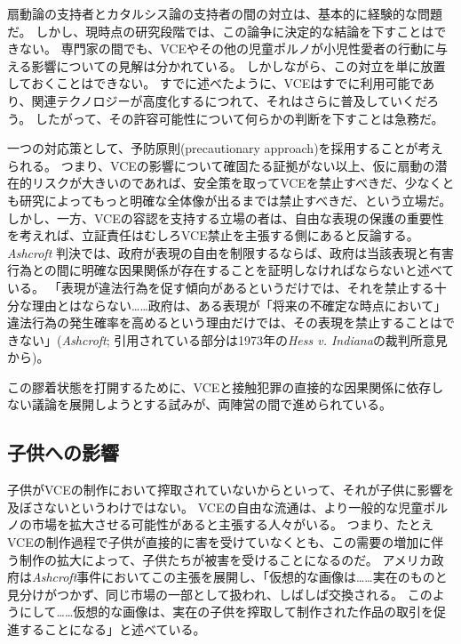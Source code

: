 \documentclass[paper=a4,book,openany]{jlreq} \usepackage{mystyle}
\begin{document}
扇動論の支持者とカタルシス論の支持者の間の対立は、基本的に経験的な問題だ。
しかし、現時点の研究段階では、この論争に決定的な結論を下すことはできない。
専門家の間でも、VCEやその他の児童ポルノが小児性愛者の行動に与える影響についての見解は分かれている\citep{ost02:_child_risk, quayle02:_child_pornog_inter, endrass09:_consum_inter_child_pornog_violen_sex_offen, seto11:_contac_sexual_offen_men_onlin, hessick11:_disen_child_pornog_child_sex_abuse}。
しかしながら、この対立を単に放置しておくことはできない。
すでに述べたように、VCEはすでに利用可能であり、関連テクノロジーが高度化するにつれて、それはさらに普及していくだろう。
したがって、その許容可能性について何らかの判断を下すことは急務だ。

一つの対応策として、予防原則(precautionary approach)を採用することが考えられる。
つまり、VCEの影響について確固たる証拠がない以上、仮に扇動の潜在的リスクが大きいのであれば、安全策を取ってVCEを禁止すべきだ、少なくとも研究によってもっと明確な全体像が出るまでは禁止すべきだ、という立場だ。
しかし、一方、VCEの容認を支持する立場の者は、自由な表現の保護の重要性を考えれば、立証責任はむしろVCE禁止を主張する側にあると反論する。
\emph{Ashcroft} 判決では、政府が表現の自由を制限するならば、政府は当該表現と有害行為との間に明確な因果関係が存在することを証明しなければならないと述べている。
「表現が違法行為を促す傾向があるというだけでは、それを禁止する十分な理由とはならない……政府は、ある表現が「将来の不確定な時点において」違法行為の発生確率を高めるという理由だけでは、その表現を禁止することはできない」(\emph{Ashcroft}; 引用されている部分は1973年の\emph{Hess v. Indiana}の裁判所意見から)。

この膠着状態を打開するために、VCEと接触犯罪の直接的な因果関係に依存しない議論を展開しようとする試みが、両陣営の間で進められている。

\subsection{子供への影響}

子供がVCEの制作において搾取されていないからといって、それが子供に影響を及ぼさないというわけではない。
VCEの自由な流通は、より一般的な児童ポルノの市場を拡大させる可能性があると主張する人々がいる。
つまり、たとえVCEの制作過程で子供が直接的に害を受けていなくとも、この需要の増加に伴う制作の拡大によって、子供たちが被害を受けることになるのだ。
アメリカ政府は\emph{Ashcroft}事件においてこの主張を展開し、「仮想的な画像は……実在のものと見分けがつかず、同じ市場の一部として扱われ、しばしば交換される。
このようにして……仮想的な画像は、実在の子供を搾取して制作された作品の取引を促進することになる」と述べている。
\end{document}
